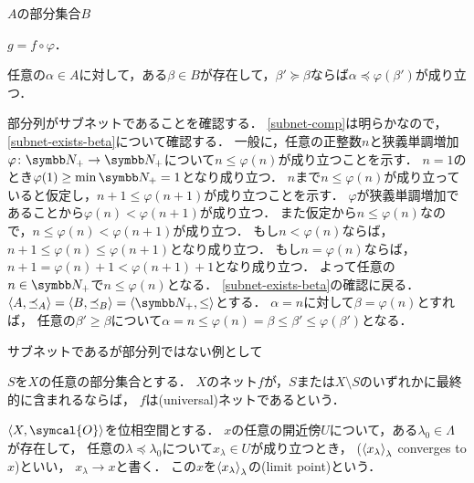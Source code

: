 \documentclass[../main.tex]{subfiles}
\begin{document}
\begin{thmbox}
\begin{definition}[（サブネット）] \(A\)の部分集合\(B\)
    \begin{conditions}
        \item\label{subnet-comp} \(g = f \circ \varphi\)．
        \item\label{subnet-exists-beta} 任意の\(\alpha \in A\)に対して，ある\(\beta \in B\)が存在して，\(\beta' \succeq \beta\)ならば\(\alpha \preceq \varphi(\beta')\)が成り立つ．
    \end{conditions}
\end{definition}
\end{thmbox}

部分列がサブネットであることを確認する．
\ref{subnet-comp}は明らかなので，\ref{subnet-exists-beta}について確認する．
一般に，任意の正整数\(n\)と狭義単調増加\(\varphi\colon\PositiveInteger\to\PositiveInteger\)について\(n \leq \varphi(n)\)が成り立つことを示す．
\(n = 1\)のとき\(\varphi(1) \geq \min \PositiveInteger = 1\)となり成り立つ．
\(n\)まで\(n \leq \varphi(n)\)が成り立っていると仮定し，\(n + 1 \leq \varphi(n + 1)\)が成り立つことを示す．
\(\varphi\)が狭義単調増加であることから\(\varphi(n) < \varphi(n + 1)\)が成り立つ．
また仮定から\(n  \leq \varphi(n)\)なので，\(n \leq \varphi(n) < \varphi(n + 1)\)が成り立つ．
もし\(n < \varphi(n)\)ならば，\(n + 1 \leq \varphi(n) \leq \varphi(n + 1)\)となり成り立つ．
もし\(n = \varphi(n)\)ならば，\(n + 1 = \varphi(n) + 1 < \varphi(n + 1) + 1\)となり成り立つ．
よって任意の\(n \in \PositiveInteger\)で\(n \leq \varphi(n)\)となる．
\ref{subnet-exists-beta}の確認に戻る．
\(\tuple{A, \preceq_A} = \tuple{B, \preceq_B} = \tuple{\PositiveInteger, \leq}\)とする．
\(\alpha = n\)に対して\(\beta = \varphi(n)\)とすれば，
任意の\(\beta' \geq \beta\)について\(\alpha = n \leq \varphi(n) = \beta \leq \beta' \leq \varphi(\beta')\)となる．

\begin{exa}サブネットであるが部分列ではない例として
\end{exa}

\begin{thmbox}
\begin{definition}
\(S\)を\(X\)の任意の部分集合とする．
\(X\)のネット\(f\)が，\(S\)または\(X \setminus S\)のいずれかに最終的に含まれるならば，
\(f\)は(universal)ネットであるという．
\end{definition}
\end{thmbox}

\begin{thmbox}
\begin{definition}
\(\tuple{X, \symcal{O}}\)を位相空間とする．
\(x\)の任意の開近傍\(U\)について，ある\(\lambda_0 \in \Lambda\)が存在して，
任意の\(\lambda \preceq \lambda_0\)について\(x_\lambda \in U\)が成り立つとき，
(\({\langle x_\lambda \rangle}_{\lambda}\) converges to \(x\))といい，
\(x_\lambda \to x\)と書く．
この\(x\)を\({\langle x_\lambda \rangle}_{\lambda}\)の(limit point)という．
\end{definition}
\end{thmbox}
\end{document}

